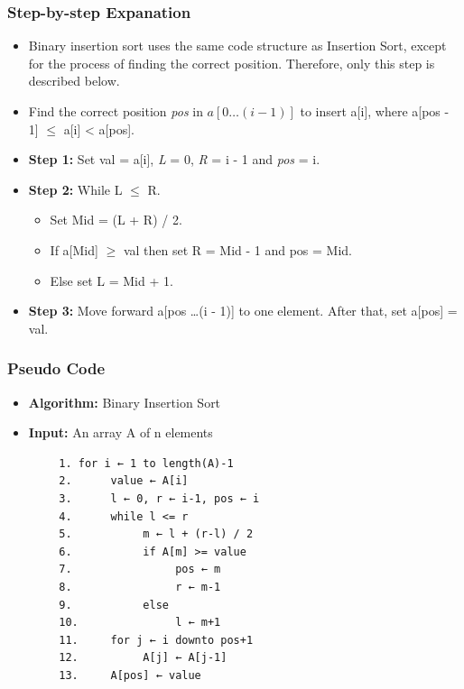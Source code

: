     \subsubsection{Step-by-step Expanation}
        \begin{itemize}
            \item Binary insertion sort uses the same code structure as Insertion Sort, except for the process of finding the correct position. Therefore, only this step is described below.
            \item Find the correct position \textit{pos} in $a[0\ldots (i - 1)]$ to insert a[i], where a[pos - 1] $\leq$ a[i] < a[pos].
            \item \textbf{Step 1:} Set val = a[i], \textit{L} = 0, \textit{R} = i - 1 and \textit{pos} = i.
            \item \textbf{Step 2:} While L $\leq$ R.
                \begin{itemize}
                    \item Set Mid = (L + R) / 2.
                    \item If a[Mid] $\geq$ val then set R = Mid - 1 and pos = Mid.
                    \item Else set L = Mid + 1.
                \end{itemize}
            \item \textbf{Step 3:} Move forward a[pos \ldots (i - 1)] to one element. After that, set a[pos] = val. 
        \end{itemize}

    \subsubsection{Pseudo Code}
        \begin{itemize}
            \item \textbf{Algorithm:} Binary Insertion Sort
            \item \textbf{Input:} An array A of n elements
        \end{itemize}
        \begin{verbatim}
        1. for i ← 1 to length(A)-1
        2.      value ← A[i]
        3.      l ← 0, r ← i-1, pos ← i
        4.      while l <= r
        5.           m ← l + (r-l) / 2
        6.           if A[m] >= value
        7.                pos ← m
        8.                r ← m-1
        9.           else
        10.               l ← m+1
        11.     for j ← i downto pos+1
        12.          A[j] ← A[j-1]
        13.     A[pos] ← value
        \end{verbatim}
